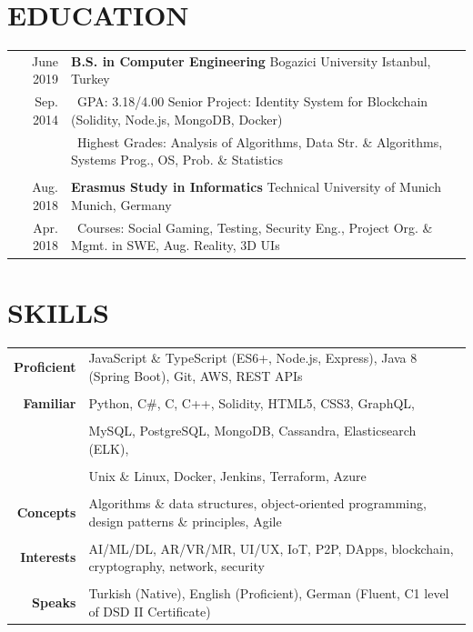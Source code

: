 \documentclass[a4paper, 10pt]{article}
\begin{document}
\section{EDUCATION}
\begin{tabular}{r p{15.7cm}}
	June 2019 & \textbf{B.S. in Computer Engineering} \hspace{1em} Bogazici University \hfill Istanbul, Turkey\\
	Sep. 2014 & \textbullet\ GPA: 3.18/4.00 \hspace{0.4em} Senior Project: Identity System for Blockchain (Solidity, Node.js, MongoDB, Docker)\\
	& \textbullet\ Highest Grades: Analysis of Algorithms, Data Str. \& Algorithms, Systems Prog., OS, Prob. \& Statistics\\\\
	Aug. 2018 & \textbf{Erasmus Study in Informatics} \hspace{1em} Technical University of Munich \hfill Munich, Germany\\
	Apr. 2018 & \textbullet\ Courses: Social Gaming, Testing, Security Eng., Project Org. \& Mgmt. in SWE, Aug. Reality, 3D UIs
\end{tabular}

\section{SKILLS}
{\renewcommand{\arraystretch}{0.7}
\begin{tabular}{r p{15.4cm}}
	\textbf{Proficient} & JavaScript \& TypeScript (ES6+, Node.js, Express), Java 8 (Spring Boot), Git, AWS, REST APIs\\\\
	\textbf{Familiar} & Python, C\#, C, C++, Solidity, HTML5, CSS3, GraphQL,\\\\
	& MySQL, PostgreSQL, MongoDB, Cassandra, Elasticsearch (ELK),\\\\
	& Unix \& Linux, Docker, Jenkins, Terraform, Azure\\\\
	\textbf{Concepts} & Algorithms \& data structures, object-oriented programming, design patterns \& principles, Agile\\\\
	\textbf{Interests} & AI/ML/DL, AR/VR/MR, UI/UX, IoT, P2P, DApps, blockchain, cryptography, network, security\\\\
	\textbf{Speaks} & Turkish (Native), English (Proficient), German (Fluent, C1 level of DSD II Certificate)
\end{tabular}}
\end{document}
